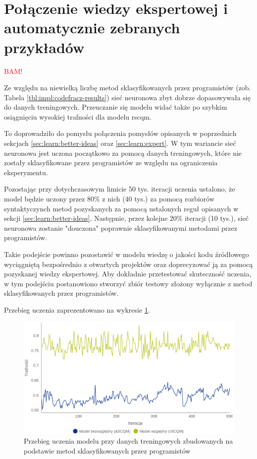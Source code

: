 \documentclass[12pt]{report}
\begin{document}
\section{Połączenie wiedzy ekspertowej i automatycznie zebranych przykładów}
\textcolor{red}{BAM!}

Ze względu na niewielką liczbę metod sklasyfikowanych przez programistów (zob. Tabela \ref{tbl:impl:codefracz-results}) sieć neuronowa zbyt dobrze dopasowywała się do danych treningowych. Przeuczanie się modelu widać także po szybkim osiągnięciu wysokiej trafności dla modelu \gls{rscqm}.

To doprowadziło do pomysłu połączenia pomysłów opisanych w poprzednich sekcjach \ref{sec:learn:better-ideas} oraz \ref{sec:learn:expert}. W tym wariancie sieć neuronowa jest uczona początkowo za pomocą danych treningowych, które nie zostały sklasyfikowane przez programistów ze względu na ograniczenia eksperymentu.

Pozostając przy dotychczasowym limicie 50 tys. iteracji uczenia ustalono, że model będzie uczony przez 80\% z nich (40 tys.) za pomocą rozbiorów syntaktyczynch metod pozyskanych za pomocą ustalonych reguł opisanych w sekcji \ref{sec:learn:better-ideas}. Następnie, przez kolejne 20\% iteracji (10 tys.), sieć neuronowa zostanie "douczona" poprawnie sklasyfikowanymi metodami przez programistów.

Takie podejście powinno pozostawić w modelu wiedzę o jakości kodu źródłowego wyciągniętą bezpośrednio z otwartych projektów oraz doprecyzować ją za pomocą pozyskanej wiedzy ekspertowej. Aby dokładnie przetestować skuteczność uczenia, w tym podejściu postanowiono stworzyć zbiór testowy złożony wyłącznie z metod sklasyfikowanych przez programistów.

Przebieg uczenia zaprezentowano na wykresie \ref{fig:learn:best-mix}.

\begin{figure}
\centering
\includegraphics[width=\textwidth]{learn/expert-only.eps}
\caption{Przebieg uczenia modelu przy danych treningowych zbudowanych na podstawie metod sklasyfikowanych przez programistów}
\label{fig:learn:best-mix}
\end{figure}
\end{document}

